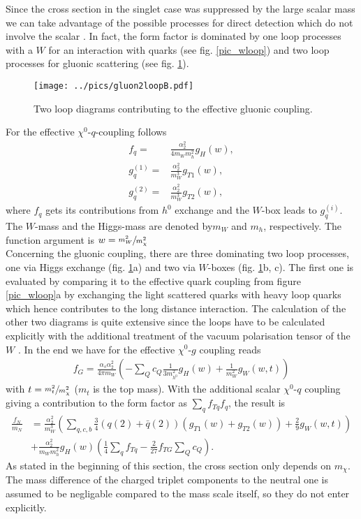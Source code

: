 Since the cross section in the singlet case was suppressed by the large scalar mass we can take advantage of the possible 
processes for direct detection which do not involve the scalar \cite{1004.4090}. In fact, the form factor is dominated by one loop processes with a 
$W$ for an interaction with quarks (see fig. \ref{pic_wloop}) and two loop processes for gluonic scattering (see fig. \ref{pic_2loopgluon}).
\begin{figure}[t]
 \texttt{[image: ../pics/gluon2loopB.pdf]}
 \caption{Two loop diagrams contributing to the effective gluonic coupling.}
 \label{pic_2loopgluon}
\end{figure}
For the effective $\chi^0$-$q$-coupling follows
\begin{align}
 f_q =& \frac{\alpha_2^2}{4m_W m_{h}^2} g_H(w),\\
 g^{(1)}_q =& \frac{\alpha_2^2}{m_W^3}g_{T1}(w),\\
 g^{(2)}_q =&\frac{\alpha_2^2}{m_W^3}g_{T2}(w), 
\end{align}
where $f_q$ gets its contributions from $h^0$ exchange and the $W$-box leads to $g^{(i)}_q$. The $W$-mass and the Higgs-mass are denoted by$m_W$ and 
$m_h$, respectively. The function argument is $w=\sfrac{m_W^2}{m_\chi^2}$ \\
\noindent Concerning the gluonic coupling, there are three dominating two loop processes, one via Higgs exchange (fig. \ref{pic_2loopgluon}a) and two
via $W$-boxes (fig. \ref{pic_2loopgluon}b, c). The first one is evaluated by comparing it to the effective quark coupling from figure \ref{pic_wloop}a
by exchanging the light scattered quarks with heavy loop quarks which hence contributes to the long distance interaction. 
The calculation of the other two diagrams is quite extensive since the loops have to be calculated explicitly with the additional treatment of the vacuum 
polarisation tensor of the $W$ \cite{1007.2601}. In the end we have for the effective $\chi^0$-$g$ coupling reads
\begin{align}
 f_G = \frac{\alpha_s\alpha_2^2}{4\pi m_W}\left(-\sum\limits_Q c_Q \frac{1}{3m_{h^0}^2} g_H(w) + \frac{1}{m_W^2} g_{W}(w,t) \right)
\end{align}
with $t=\sfrac{m_t^2}{m_\chi^2}$ ($m_t$ is the top mass).
With the additional scalar $\chi^0$-$q$ coupling giving a contribution to the form factor as $\sum_qf_{Tq}f_q$, the result is
\begin{align}
 \frac{f_N}{m_N} &= \frac{\alpha_2^2}{m_W^3}\left(\sum\limits_{q,c,b} \frac34 \left(q(2)+\bar q(2)\right) \left(g_{T1}(w) + g_{T2}(w)\right) + \frac29g_W(w,t)\right) \\
 \nonumber
 &+ \frac{\alpha_2^2}{m_W m_h^2}g_H(w) \left(\frac14 \sum\limits_q f_{Tq} - \frac{2}{27}f_{TG}\sum\limits_Q c_Q \right).
\end{align}
As stated in the beginning of this section, the cross section only depends
on $m_\chi$. The mass difference of the charged triplet components to the neutral one is assumed to be negligable compared to the mass scale itself,
so they do not enter explicitly. 

